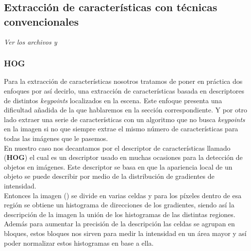 \subsection{Extracción de características con técnicas convencionales}

\emph{Ver los archivos  y }

\subsubsection{HOG}

Para la extracción de características nosotros tratamos de poner en práctica dos enfoques por así decirlo, una extracción de características basada en descriptores de distintos \textit{keypoints} localizados en la escena. Este enfoque presenta una dificultad añadida de la que hablaremos en la sección correspondiente. Y por otro lado extraer una serie de características con un algoritmo que no busca \textit{keypoints} en la imagen si no que siempre extrae el mismo número de características para todas las imágenes que le pasemos.\\

En nuestro caso nos decantamos por el descriptor de características llamado  (\textbf{HOG}) el cual es un descriptor usado en muchas ocasiones para la detección de objetos en imágenes. Este descriptor se basa en que la apariencia local de un objeto se puede describir por medio de la distribución de gradientes de intensidad.\\

Entonces la imagen () se divide en varias celdas y para los píxeles dentro de esa región se obtiene un histograma de direcciones de los gradientes, siendo así la descripción de la imagen la unión de los histogramas de las distintas regiones. Además para aumentar la precisión de la descripción las celdas se agrupan en bloques, estos bloques nos sirven para medir la intensidad en un área mayor y así poder normalizar estos histogramas en base a ella.\\

